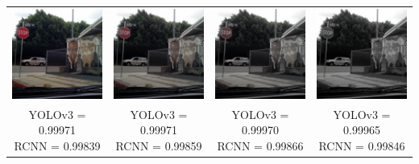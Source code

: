 \documentclass{article}
\begin{document}
\begin{center}
\begin{tabular}{ c c c c }
    \includegraphics[width=0.2\linewidth]{../test_images/stop3.png} & \includegraphics[width=0.2\linewidth]{../test_images/perturbed//stop3_grayscale_0_500.png} & \includegraphics[width=0.2\linewidth]{../test_images/perturbed/stop3_grayscale_0_250.png} & \includegraphics[width=0.2\linewidth]{../test_images/perturbed/stop3_grayscale_0_010.png} \\
    \makecell{YOLOv3 = 0.99971 \\ RCNN = 0.99839} & \makecell{YOLOv3 = 0.99971 \\ RCNN = 0.99859} & \makecell{YOLOv3 = 0.99970 \\ RCNN = 0.99866} & \makecell{YOLOv3 = 0.99965 \\ RCNN = 0.99846} \\  
\end{tabular}
\end{center}
\end{document}

